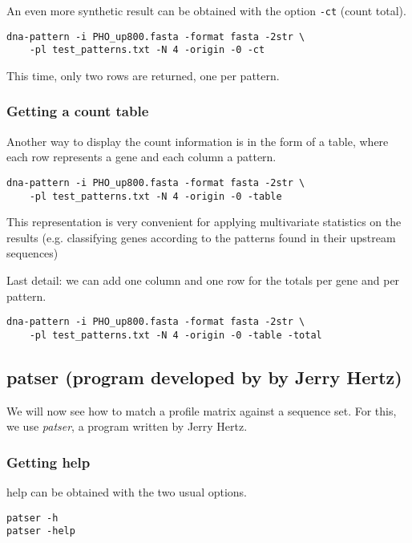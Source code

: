 An even more synthetic result can be obtained with the option
\texttt{-ct} (count total).

\begin{verbatim}
dna-pattern -i PHO_up800.fasta -format fasta -2str \
    -pl test_patterns.txt -N 4 -origin -0 -ct
\end{verbatim}

This time, only two rows are returned, one per pattern. 

\subsubsection{Getting a count table}

Another way to display the count information is in the form of a
table, where each row represents a gene and each column a pattern.

\begin{verbatim}
dna-pattern -i PHO_up800.fasta -format fasta -2str \
    -pl test_patterns.txt -N 4 -origin -0 -table
\end{verbatim}

This representation is very convenient for applying multivariate
statistics on the results (e.g. classifying genes according to the
patterns found in their upstream sequences)

Last detail: we can add one column and one row for the totals per
gene and per pattern.

\begin{verbatim}
dna-pattern -i PHO_up800.fasta -format fasta -2str \
    -pl test_patterns.txt -N 4 -origin -0 -table -total
\end{verbatim}




\subsection{patser (program developed by by Jerry Hertz)}

We will now see how to match a profile matrix against a sequence
set. For this, we use \textit{patser}, a program written by Jerry
Hertz. 

\subsubsection{Getting help}

help can be obtained with the two usual options.

\begin{verbatim}
patser -h
patser -help
\end{verbatim}

